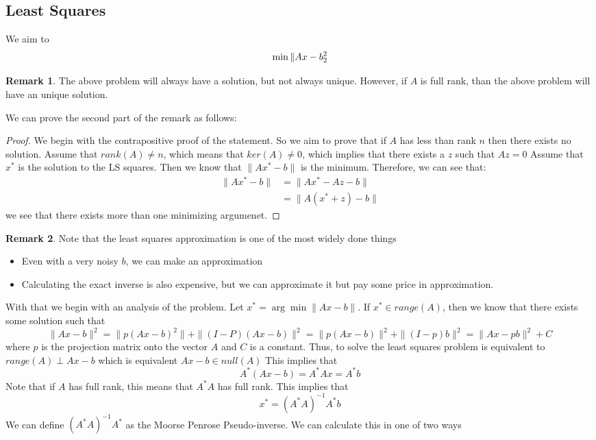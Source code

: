 \documentclass[11pt]{article}
\theoremstyle{definition}
\newtheorem{remark}{Remark}[section]
\begin{document}
\subsection{Least Squares} 
We aim to 
\[
\min \|Ax - b \\^2_2
\]
\begin{remark}
  The above problem will always have a solution, but not always unique. However, if $A$ is full rank, than the above problem will have an unique solution. 
\end{remark}
We can prove the second part of the remark as follows:
\begin{proof}
  We begin with the contrapositive proof of the statement. So we aim to prove that if $A$ has less than rank $n$ then there exists no solution. Assume that $rank(A) \neq n$, which means that $ker(A) \neq 0$, which implies that there exists a $z$ such that $Az = 0$ Assume that $x^*$ is the solution to the LS squares. Then we know that $\|Ax^* - b\|$ is the minimum. Therefore, we can see that:
  \begin{align*}
    \|Ax^* - b\| &= \|Ax^* - Az - b\| \\
    &= \|A(x^* + z) - b\|
  \end{align*}
  we see that there exists more than one minimizing argumenet. 
\end{proof}
\begin{remark}
  Note that the least squares approximation is one of the most widely done things
  \begin{itemize}
    \item Even with a very noisy $b$, we can make an approximation
    \item Calculating the exact inverse is also expensive, but we can approximate it but pay some price in approximation.
  \end{itemize}
\end{remark}
With that we begin with an analysis of the problem. Let $x^* = \arg \min \|Ax - b\|$. If $x^* \in range(A)$, then we know that there exists some solution such that 
\[
\|Ax - b\|^2 = \|p (Ax - b)^2\| + \|(I- P)(Ax -b)\|^2 = \|p(Ax - b)\|^2 + \|(I - p)b\|^2 = \|Ax - pb\|^2 + C
\]
where $p$ is the projection matrix onto the vector $A$ and $C$ is a constant. Thus, to solve the least squares problem is equivalent to$range(A) \perp Ax - b$ which is equivalent $Ax - b \in null(A)$ This implies that 
\[
A^*(Ax - b) = A^* A x = A^* b
\]
Note that if $A$ has full rank, this means that $A^* A$ has full rank. This implies that
\[
x^* = (A^* A)^{-1} A^* b
\]
We can define $(A^* A)^{-1} A^*$ as the Moorse Penrose Pseudo-inverse. We can calculate this in one of two ways 
\end{document}
